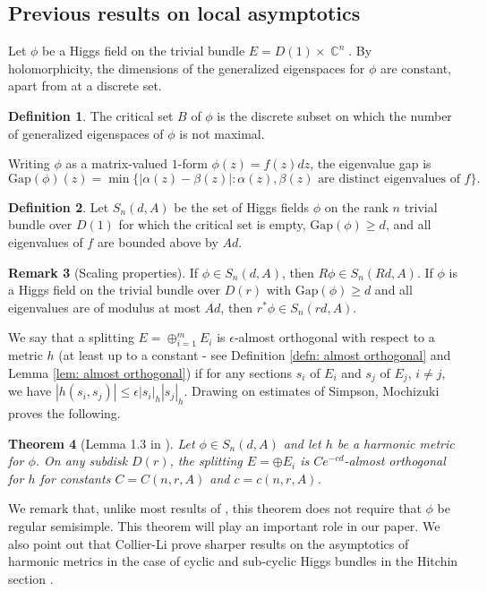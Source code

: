\documentclass[10pt]{amsart}
\newtheorem{thm}{Theorem}[section]
\theoremstyle{definition}
\newtheorem{defn}[thm]{Definition}
\newtheorem{remark}[thm]{Remark}
\DeclareMathOperator{\C}{\mathbb{C}}
\begin{document}
\subsection{Previous results on local asymptotics}  Let $\phi$ be a Higgs field on the trivial bundle $E=D(1)\times \C^n$. By holomorphicity, the dimensions of the generalized eigenspaces for $\phi$ are constant, apart from at a discrete set.
\begin{defn}\label{def: critical set}
    The critical set $B$ of $\phi$ is the discrete subset on which the number of generalized eigenspaces of $\phi$ is not maximal.
\end{defn}
Writing $\phi$ as a matrix-valued $1$-form $\phi(z)=f(z)dz$, the eigenvalue gap is 
$$\textrm{Gap}(\phi)(z) = \min\{ |\alpha(z) - \beta(z)|: \alpha(z),\beta(z) \textrm{ are distinct eigenvalues of }f\}.$$

\begin{defn} \label{dfn:S(d,A)}
Let $S_n(d,A)$ be the set of Higgs fields $\phi$ on the rank $n$ trivial bundle over $D(1)$ for which the critical set is empty, $\textrm{Gap}(\phi)\geq d$, and all eigenvalues of $f$ are bounded above by $Ad.$ 
\end{defn}

\begin{remark}[Scaling properties] If $\phi \in S_n(d,A)$, then $R\phi \in S_n(Rd,A)$. If $\phi$ is a Higgs field on the trivial bundle over $D(r)$ with $\mathrm{Gap}(\phi) \geq d$ and all eigenvalues are of modulus at most $Ad$, then $r^*\phi \in S_n(rd, A)$.
\end{remark}

We say that a splitting $E=\oplus_{i=1}^m E_i$ is $\epsilon$-almost orthogonal with respect to a metric $h$ (at least up to a constant - see Definition \ref{defn: almost orthogonal} and Lemma \ref{lem: almost orthogonal}) if for any sections $s_i$ of $E_i$ and $s_j$ of $E_j$, $i\neq j,$ we have $|h(s_i,s_j)|\leq \epsilon|s_i|_h|s_j|_h.$ Drawing on estimates of Simpson, Mochizuki proves the following.
\begin{thm}[Lemma 1.3 in \cite{Mo}]\label{GRSdecoupling} Let $\phi \in S_n(d,A)$ and let $h$ be a harmonic metric for $\phi$. On any subdisk $D(r)$, the splitting $E = \oplus E_i$ is $Ce^{-cd}$-almost orthogonal for $h$ for constants $C=C(n, r, A)$ and $c=c(n,r,A)$.
\end{thm}
We remark that, unlike most results of \cite{Mo}, this theorem does not require that $\phi$ be regular semisimple. This theorem will play an important role in our paper. We also point out that Collier-Li prove sharper results on the asymptotics of harmonic metrics in the case of cyclic and sub-cyclic Higgs bundles in the Hitchin section \cite{CL}.
\end{document}
